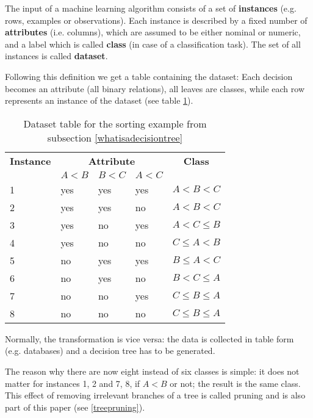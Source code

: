 \begin{definition}
    The input of a machine learning algorithm consists of a set of \textbf{instances} (e.g. rows, examples or observations). Each instance is described by a fixed number of \textbf{attributes} (i.e. columns), which are assumed to be either nominal or numeric, and a label which is called \textbf{class} (in case of a classification task). The set of all instances is called \textbf{dataset}.
\end{definition}

Following this definition we get a table containing the dataset: Each decision becomes an attribute (all binary relations), all leaves are classes, while each row represents an instance of the dataset (see table \ref{tab:decisiontable}).

\begin{table}[!h] \centering
\begin{tabular}{|l| l l l |l|} \hline
    \textbf{Instance} & \multicolumn{3}{c|}{\textbf{Attribute}} & \multicolumn{1}{c|}{\textbf{Class}}\\ 
    & $A<B$ & $B<C$ & $A<C$ &  \\ \hline
    1 & yes & yes & yes & $A < B < C$ \\ 
    2 & yes & yes & no & $A < B < C$ \\
    3 & yes & no & yes & $A < C \leq B$ \\
    4 & yes & no & no & $C \leq A < B$ \\
    5 & no & yes & yes & $B \leq A < C$ \\ 
    6 & no & yes & no & $B < C \leq A$ \\
    7 & no & no & yes & $C \leq B \leq A$ \\
    8 & no & no & no & $C \leq B \leq A$ \\ \hline
\end{tabular}
\caption{Dataset table for the sorting example from subsection \ref{whatisadecisiontree}}
\label{tab:decisiontable}
\end{table}

Normally, the transformation is vice versa: the data is collected in table form (e.g. databases) and a decision tree has to be generated. 

The reason why there are now eight instead of six classes is simple: it does not matter for instances 1, 2 and 7, 8, if $A<B$ or not; the result is the same class. This effect of removing irrelevant branches of a tree is called pruning and is also part of this paper (see \ref{treepruning}). 


